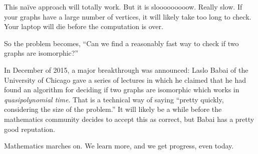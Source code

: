 \documentclass[12pt,letterpaper]{article}
\theoremstyle{definition}
\begin{document}
This na\"{i}ve approach will totally work. But it is slooooooooow. Really slow. If your graphs have a large number
of vertices, it will likely take too long to check. Your laptop will die before the computation is over.

So the problem becomes, ``Can we find a reasonably fast way to check if two graphs are isomorphic?''

In December of 2015, a major breakthrough was announced: Laslo Babai of the University of Chicago gave a series
of lectures in which he claimed
that he had found an algorithm for deciding if two graphs are isomorphic which works in \emph{quasipolynomial
time}. That is a technical way of saying ``pretty quickly, considering the size of the problem.''  It will likely be a while before the mathematics community decides to accept this as correct, but Babai has a pretty good reputation. 

Mathematics marches on. We learn more, and we get progress, even today.


\end{document}
